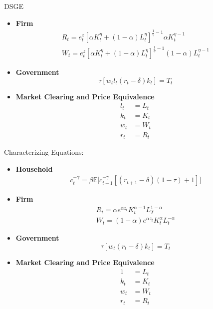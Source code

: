 \documentclass[12pt]{article}
\newenvironment{problem}[2][Problem]{\begin{trivlist}
\item[\hskip \labelsep {\bfseries #1}\hskip \labelsep {\bfseries #2.}]}{\end{trivlist}}
\theoremstyle{definition}
\theoremstyle{definition}
\theoremstyle{definition}
\theoremstyle{definition}
\begin{document}
\begin{section}{DSGE}
\begin{problem}{4}
\begin{itemize}
\item \textbf{Firm}
\begin{align}
R_t = e^z_t [\alpha K^{\eta}_t +(1-\alpha)L^{\eta}_t]^{\frac{1}{\eta} - 1} \alpha K_t^{\eta -1} \\
W_t = e^z_t [\alpha K^{\eta}_t +(1-\alpha)L^{\eta}_t]^{\frac{1}{\eta} - 1} (1-\alpha) L_t^{\eta -1}
\end{align}
\item \textbf{Government}
\begin{equation}
\tau[w_tl_t(r_t - \delta)k_t] = T_t
\end{equation}
\item \textbf{Market Clearing and Price Equivalence}
\begin{align}
l_t &= L_t \\
k_t &= K_t \\
w_t &= W_t \\
r_t &= R_t 
\end{align}
\end{itemize}
\end{problem}

\begin{problem}{5} Characterizing Equations:
\begin{itemize}
\item \textbf{Household}
\begin{align}
c_t^{-\gamma} = \beta \mathbb{E} \big[ c_{t+1}^{-\gamma}[(r_{t+1}-\delta)(1-\tau) +1] \big]
\end{align}

\item \textbf{Firm}
\begin{align}
R_t = \alpha e^{\alpha z_t} K_t^{\alpha - 1} L_T^{1-\alpha} \\
W_t = (1 - \alpha) e^{\alpha z_t} K_t^\alpha L_t^{- \alpha}
\end{align}

\item \textbf{Government}
\begin{equation}
\tau[w_t(r_t - \delta)k_t] = T_t
\end{equation}
\item \textbf{Market Clearing and Price Equivalence}
\begin{align}
1 &= L_t \\
k_t &= K_t \\
w_t &= W_t \\
r_t &= R_t 
\end{align}


\end{itemize}
\end{problem}
\end{section}
\end{document}
